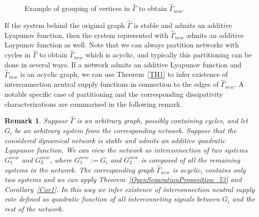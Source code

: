 \documentclass[11pt,a4paper,oneside,DIV=12,headings=small]{scrartcl}
\theoremstyle{plain}
\newtheorem{remark}[theorem]{Remark}
\begin{document}
\begin{figure}[h!]
\caption{Example of grouping of vertices in $\hat{\Gamma}$ to obtain $\hat{\Gamma}_{new}$.}
\label{NewNetwork}
\end{figure}


If the system behind the original graph $\hat{\Gamma}$ is stable and admits an additive Lyapunov function, then the system represented with $\hat{\Gamma}_{new}$ admits an additive Laypunov function as well. 
Note that we can always partition networks with cycles in $\hat{\Gamma}$ to obtain $\hat{\Gamma}_{new}$ which is acyclic, and typically this partitioning can be done in several ways. If a network admits an additive Lyapunov function and $\hat{\Gamma}_{new}$ is an acyclic graph, we can use Theorem~\ref{TH1} to infer existence of interconnection neutral supply functions in connection to the edges of $\hat{\Gamma}_{new}$. 
A notable specific case of partitioning and the corresponding dissipativity characterizations are summarised in the following remark.    

\begin{remark}
\label{CorCycles}
Suppose $\hat{\Gamma}$ is an arbitrary graph, possibly containing cycles, and let $G_i$ be an arbitrary system from the corresponding network. Suppose that the considered dynamical network is stable and admits an additive quadratic Lyapunov function. We can view the network as interconnection of two systems $G_1^{new}$ and $G_2^{new}$, where $G_1^{new}:=G_i$ and $G_2^{new}$ is composed of all the remaining systems in the network. The corresponding graph $\hat{\Gamma}_{new}$ is acyclic, contains only two systems and we can apply Theorem~\ref{OpenSeparationProposition_53} and Corollary~\ref{Cor1}. In this way we infer existence of interconnection neutral supply rate defined as quadratic function of all interconneting signals between $G_i$ and the rest of the network.       
\end{remark}
\end{document}
